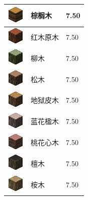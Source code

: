 \documentclass[UTF8]{ctexart}
\begin{document}
\begin{longtable}[]{|p{1cm}|p{8cm}|p{1.5cm}|}
	\hline
	\includegraphics{.workspace/icons/biomesoplenty/biomesoplenty__log_1__7.png} & 棕榈木 &7.50\\
	\hline
	\includegraphics{.workspace/icons/biomesoplenty/biomesoplenty__log_2__4.png} & 红木原木 &7.50\\
	\hline
	\includegraphics{.workspace/icons/biomesoplenty/biomesoplenty__log_2__5.png} & 柳木 &7.50\\
	\hline
	\includegraphics{.workspace/icons/biomesoplenty/biomesoplenty__log_2__6.png} & 松木 &7.50\\
	\hline
	\includegraphics{.workspace/icons/biomesoplenty/biomesoplenty__log_2__7.png} & 地狱皮木 &7.50\\
	\hline
	\includegraphics{.workspace/icons/biomesoplenty/biomesoplenty__log_3__4.png} & 蓝花楹木 &7.50\\
	\hline
	\includegraphics{.workspace/icons/biomesoplenty/biomesoplenty__log_3__5.png} & 桃花心木 &7.50\\
	\hline
	\includegraphics{.workspace/icons/biomesoplenty/biomesoplenty__log_3__6.png} & 檀木 &7.50\\
	\hline
	\includegraphics{.workspace/icons/biomesoplenty/biomesoplenty__log_3__7.png} & 桉木 &7.50\\

\end{longtable}
\end{document}
